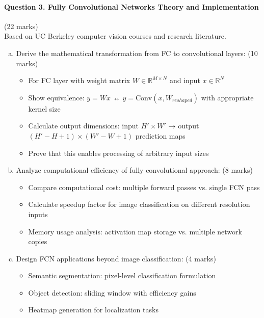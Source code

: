 \documentclass[12pt]{article}
\newcommand{\shortanswer}{\vspace{2cm}}
\newcommand{\mediumanswer}{\vspace{3cm}}
\newcommand{\journalspace}{\vspace{4.5cm}}
\begin{document}
\newpage
\paragraph{Question 3. Fully Convolutional Networks Theory and Implementation}{{\hfill (22 marks)}}\\
Based on UC Berkeley computer vision courses and research literature.

\begin{enumerate}[(a)]
    \item Derive the mathematical transformation from FC to convolutional layers: \hfill (10 marks)
    \begin{itemize}
        \item For FC layer with weight matrix $W \in \mathbb{R}^{M \times N}$ and input $x \in \mathbb{R}^N$
        \item Show equivalence: $y = Wx$ ↔ $y = \text{Conv}(x, W_{reshaped})$ with appropriate kernel size
        \item Calculate output dimensions: input $H' \times W'$ → output $(H'-H+1) \times (W'-W+1)$ prediction maps
        \item Prove that this enables processing of arbitrary input sizes
    \end{itemize}
    
    \journalspace
    
    \item Analyze computational efficiency of fully convolutional approach: \hfill (8 marks)
    \begin{itemize}
        \item Compare computational cost: multiple forward passes vs. single FCN pass
        \item Calculate speedup factor for image classification on different resolution inputs
        \item Memory usage analysis: activation map storage vs. multiple network copies
    \end{itemize}
    
    \mediumanswer
    
    \item Design FCN applications beyond image classification: \hfill (4 marks)
    \begin{itemize}
        \item Semantic segmentation: pixel-level classification formulation
        \item Object detection: sliding window with efficiency gains
        \item Heatmap generation for localization tasks
    \end{itemize}
    
    \shortanswer
\end{enumerate}
\end{document}
